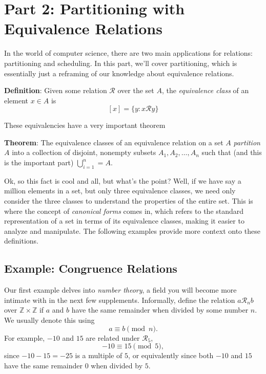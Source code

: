 \documentclass{article}
\begin{document}
\section*{Part 2: Partitioning with Equivalence Relations}
    In the world of computer science, there are two main applications for relations: partitioning and scheduling. In this part, we'll cover partitioning, which is essentially just a reframing of our knowledge about equivalence relations.

    \vspace{2mm}
    \textbf{Definition}: Given some relation $\mathcal{R}$ over the set $A$, the \textit{equivalence class} of an element $x \in A$ is $$[x] = \{y : x \mathcal{R} y\}$$

    These equivalencies have a very important theorem

    \begin{tcolorbox}
        \textbf{Theorem}: The equivalence classes of an equivalence relation on a set $A$ \textit{partition} $A$ into a collection of disjoint, nonempty subsets $A_{1}, A_{2}, \dots, A_{n}$ such that (and this is the important part) $\bigcup _{i = 1}^{n} = A$.
    \end{tcolorbox}
    
    \vspace{2mm}
    Ok, so this fact is cool and all, but what's the point? Well, if we have say a million elements in a set, but only three equivalence classes, we need only consider the three classes to understand the properties of the entire set. This is where the concept of \textit{canonical forms} comes in, which refers to the standard representation of a set in terms of its equivalence classes, making it easier to analyze and manipulate. The following examples provide more context onto these definitions.

    \subsection*{Example: Congruence Relations}
        Our first example delves into \textit{number theory}, a field you will become more intimate with in the next few supplements. Informally, define the relation $a\mathcal{R}_{n}b$ over $\mathbb{Z} \times \mathbb{Z}$ if $a$ and $b$ have the same remainder when divided by some number $n$. We usually denote this using $$a \equiv b \pmod{n}.$$ For example, $-10$ and $15$ are related under $\mathcal{R}_{5}$, $$-10 \equiv 15 \pmod{5},$$ since $-10 - 15 = -25$ is a multiple of $5$, or equivalently since both $-10$ and $15$ have the same remainder $0$ when divided by $5$.
        
\end{document}
